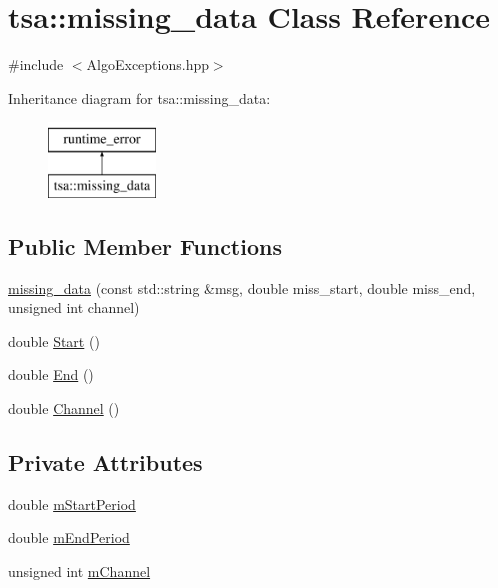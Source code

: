 \hypertarget{classtsa_1_1missing__data}{}\section{tsa\+:\+:missing\+\_\+data Class Reference}
\label{classtsa_1_1missing__data}


{\ttfamily \#include $<$Algo\+Exceptions.\+hpp$>$}

Inheritance diagram for tsa\+:\+:missing\+\_\+data\+:\begin{figure}[H]
\begin{center}
\leavevmode
\includegraphics[height=2.000000cm]{classtsa_1_1missing__data}
\end{center}
\end{figure}
\subsection*{Public Member Functions}
\begin{DoxyCompactItemize}
\item 
\hyperlink{classtsa_1_1missing__data_a8d5ae46c22478ec86fae022f0044d2b7}{missing\+\_\+data} (const std\+::string \&msg, double miss\+\_\+start, double miss\+\_\+end, unsigned int channel)
\item 
double \hyperlink{classtsa_1_1missing__data_a14e20caa0f0f2baf341625d09e9da157}{Start} ()
\item 
double \hyperlink{classtsa_1_1missing__data_a10c01ad5fd1fd4bc26d69114cb90ee08}{End} ()
\item 
double \hyperlink{classtsa_1_1missing__data_a96f7fd1c113289c1cfd22117fda3ec83}{Channel} ()
\end{DoxyCompactItemize}
\subsection*{Private Attributes}
\begin{DoxyCompactItemize}
\item 
double \hyperlink{classtsa_1_1missing__data_a3bb2ac2dd0703730e7f0b29037bf65aa}{m\+Start\+Period}
\item 
double \hyperlink{classtsa_1_1missing__data_ae4ac26763b09836066dd3202f421a2cc}{m\+End\+Period}
\item 
unsigned int \hyperlink{classtsa_1_1missing__data_ac223001a840eeb59c73cb0cef2483ed2}{m\+Channel}
\end{DoxyCompactItemize}


